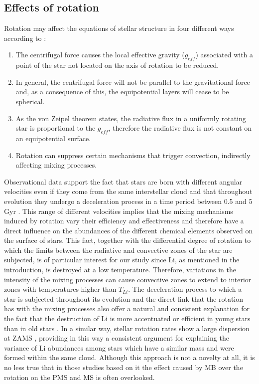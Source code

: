 \documentclass[fleqn,usenatbib]{mnras}
\begin{document}
\subsection{Effects of rotation}
Rotation may affect the equations of stellar structure in four different ways according to \citet{Endal1976}:
\begin{enumerate}
    \item The centrifugal force causes the local effective gravity ($g_{eff}$) associated with a point of the star not located on the axis of rotation to be reduced.
    \item In general, the centrifugal force will not be parallel to the gravitational force and, as a consequence of this, the equipotential layers will cease to be spherical.
    \item As the von Zeipel theorem states, the radiative flux in a uniformly rotating star is proportional to the $g_{eff}$, therefore the radiative flux is not constant on an equipotential surface.
    \item Rotation can suppress certain mechanisms that trigger convection, indirectly affecting mixing processes.
\end{enumerate}

Observational data support the fact that stars are born with different angular velocities even if they come from the same interstellar cloud and that throughout evolution they undergo a deceleration process \citep{Skumanich1972} in a time period between 0.5 and 5 Gyr \citep{Somers2014a}. This range of different velocities implies that the mixing mechanisms induced by rotation vary their efficiency and effectiveness and therefore have a direct influence on the abundances of the different chemical elements observed on the surface of stars.  This fact, together with the differential degree of rotation to which the limits between the radiative and convective zones of the star are subjected, is of particular interest for our study since Li, as mentioned in the introduction, is destroyed at a low temperature. Therefore, variations in the intensity of the mixing processes can cause convective zones to extend to interior zones with temperatures higher than $T_{Li}$. The deceleration process to which a star is subjected throughout its evolution and the direct link that the rotation has with the mixing processes also offer a natural and consistent explanation for the fact that the destruction of Li is more accentuated or efficient in young stars than in old stars \citep{Sestito2005}. In a similar way, stellar rotation rates show a large dispersion at ZAMS \citep{Stauffer1984}, providing in this way a consistent argument for explaining the variance of Li abundances among stars which have a similar mass and were formed within the same cloud. Although this approach is not a novelty at all, it is no less true that in those studies based on it the effect caused by MB over the rotation on the PMS and MS is often overlooked. \par
\end{document}
